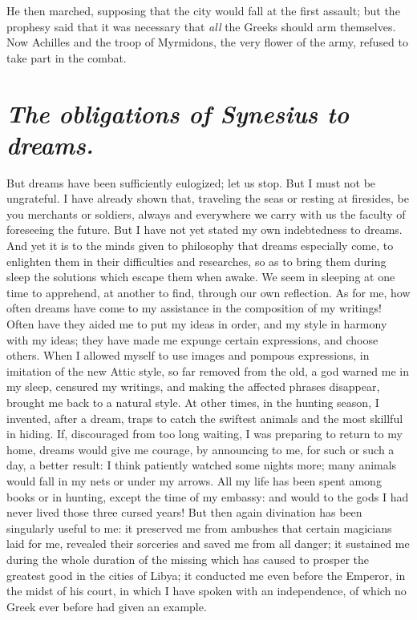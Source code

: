 \documentclass[12pt]{article}
\begin{document}
\noindent He then marched, supposing that the city would fall at the first
assault; but the prophesy said that it was necessary that \textit{all} the
Greeks should arm themselves. Now Achilles and the troop of Myrmidons, the very
flower of the army, refused to take part in the combat.


\section{\mdseries\itshape The obligations of Synesius to dreams.}

But dreams have been sufficiently eulogized; let us stop. But I must not be
ungrateful. I have already shown that, traveling the seas or resting at
firesides, be you merchants or soldiers, always and everywhere we carry with us
the faculty of foreseeing the future. But I have not yet stated my own
indebtedness to dreams. And yet it is to the minds given to philosophy that
dreams especially come, to enlighten them in their difficulties and researches,
so as to bring them during sleep the solutions which escape them when awake. We
seem in sleeping at one time to apprehend, at another to find, through our own
reflection. As for me, how often dreams have come to my assistance in the
composition of my writings! Often have they aided me to put my ideas in order,
and my style in harmony with my ideas; they have made me expunge certain
expressions, and choose others. When I allowed myself to use images and pompous
expressions, in imitation of the new Attic style, so far removed from the old,
a god warned me in my sleep, censured my writings, and making the affected
phrases disappear, brought me back to a natural style. At other times, in the
hunting season, I invented, after a dream, traps to catch the swiftest animals
and the most skillful in hiding. If, discouraged from too long waiting, I was
preparing to return to my home, dreams would give me courage, by announcing to
me, for such or such a day, a better result: I think patiently watched some
nights more; many animals would fall in my nets or under my arrows. All my life
has been spent among books or in hunting, except the time of my embassy: and
would to the gods I had never lived those three cursed years! But then again
divination has been singularly useful to me: it preserved me from ambushes that
certain magicians laid for me, revealed their sorceries and saved me from all
danger; it sustained me during the whole duration of the missing which has
caused to prosper the greatest good in the cities of Libya; it conducted me
even before the Emperor, in the midst of his court, in which I have spoken with
an independence, of which no Greek ever before had given an example.
\end{document}
